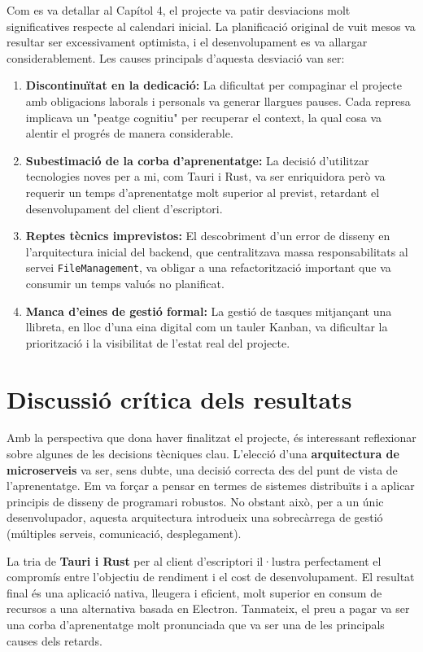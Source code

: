 Com es va detallar al Capítol 4, el projecte va patir desviacions molt significatives respecte al calendari inicial. La planificació original de vuit mesos va resultar ser excessivament optimista, i el desenvolupament es va allargar considerablement. Les causes principals d'aquesta desviació van ser:
\begin{enumerate}
    \item \textbf{Discontinuïtat en la dedicació:} La dificultat per compaginar el projecte amb obligacions laborals i personals va generar llargues pauses. Cada represa implicava un "peatge cognitiu" per recuperar el context, la qual cosa va alentir el progrés de manera considerable.
    \item \textbf{Subestimació de la corba d'aprenentatge:} La decisió d'utilitzar tecnologies noves per a mi, com Tauri i Rust, va ser enriquidora però va requerir un temps d'aprenentatge molt superior al previst, retardant el desenvolupament del client d'escriptori.
    \item \textbf{Reptes tècnics imprevistos:} El descobriment d'un error de disseny en l'arquitectura inicial del backend, que centralitzava massa responsabilitats al servei \texttt{FileManagement}, va obligar a una refactorització important que va consumir un temps valuós no planificat.
    \item \textbf{Manca d'eines de gestió formal:} La gestió de tasques mitjançant una llibreta, en lloc d'una eina digital com un tauler Kanban, va dificultar la priorització i la visibilitat de l'estat real del projecte.
\end{enumerate}

\section{Discussió crítica dels resultats}

Amb la perspectiva que dona haver finalitzat el projecte, és interessant reflexionar sobre algunes de les decisions tècniques clau. L'elecció d'una \textbf{arquitectura de microserveis} va ser, sens dubte, una decisió correcta des del punt de vista de l'aprenentatge. Em va forçar a pensar en termes de sistemes distribuïts i a aplicar principis de disseny de programari robustos. No obstant això, per a un únic desenvolupador, aquesta arquitectura introdueix una sobrecàrrega de gestió (múltiples serveis, comunicació, desplegament).

La tria de \textbf{Tauri i Rust} per al client d'escriptori il·lustra perfectament el compromís entre l'objectiu de rendiment i el cost de desenvolupament. El resultat final és una aplicació nativa, lleugera i eficient, molt superior en consum de recursos a una alternativa basada en Electron. Tanmateix, el preu a pagar va ser una corba d'aprenentatge molt pronunciada que va ser una de les principals causes dels retards.

